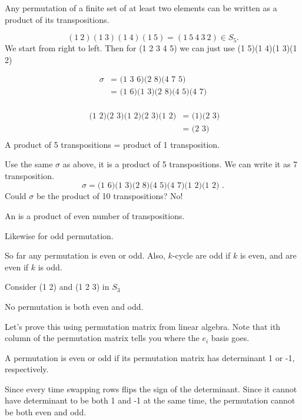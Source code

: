 \documentclass[class=article,crop=false]{standalone}
\begin{document}
\begin{coro}[9.12]
	Any permutation of a finite set of at least two elements can be written as a product of its transpositions.
\end{coro}
\begin{eg}[]
\[
	(1\ 2)(1\ 3)(1\ 4)(1\ 5) = (1\ 5\ 4\ 3\ 2) \in S_5
.\] 
We start from right to left. Then for (1 2 3 4 5) we can just use (1 5)(1 4)(1 3)(1 2)
\end{eg}

\begin{eg}[]
\begin{align*}
	\sigma &= \text{ (1 3 6)(2 8)(4 7 5)} \\
	       &= \text{ (1 6)(1 3)(2 8)(4 5)(4 7)}  \\
\end{align*}
\end{eg}

\begin{eg}[]
\begin{align*}
	\text{ (1 2)(2 3)(1 2)(2 3)(1 2)} &= \text{ (1)(2 3)}  \\
					  &= \text{ (2 3)}  \\
\end{align*}
A product of 5 transpositions = product of 1 transposition.
\end{eg}
\begin{eg}[]
Use the same $ \sigma$ as above, it is a product of 5 transpositions. We can write it as 7 transposition.
\[
	\sigma = \text{(1 6)(1 3)(2 8)(4 5)(4 7)(1 2)(1 2) } 
.\] 
Could $ \sigma$ be the product of 10 transpositions? No!
\end{eg}

\begin{defn}
An  is a product of even number of transpositions. 
\end{defn}
Likewise for odd permutation.
\begin{note}
So far any permutation is even or odd. Also, $ k$-cycle are odd if  $ k$ is even, and are even if  $ k$ is odd.
\end{note}
\begin{eg}[]
	Consider (1 2) and (1 2 3) in $ S_3$
\end{eg}

\begin{claim}[]
No permutation is both even and odd.
\end{claim}
Let's prove this using permutation matrix from linear algebra. Note that ith column of the permutation matrix tells you where the $ e_i$ basis goes.
\begin{prf}
\begin{claim}[]
	A permutation is even or odd if its permutation matrix has determinant 1 or -1, respectively.
\end{claim}
Since every time swapping rows flips the sign of the determinant. Since it cannot have determinant to be both 1 and -1 at the same time, the permutation cannot be both even and odd.
\end{prf}
\end{document}
